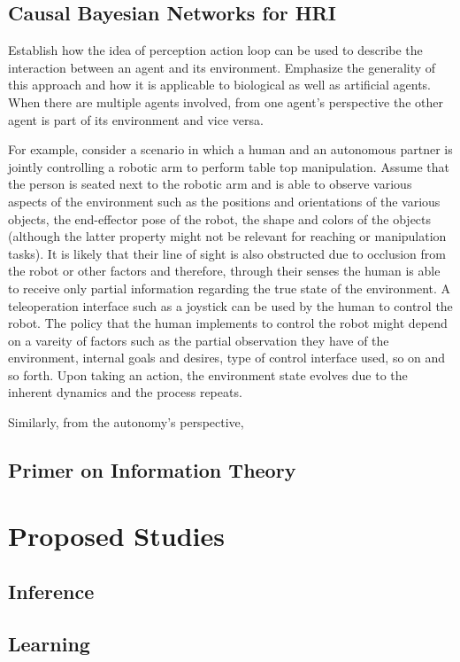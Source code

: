 \documentclass[12pt]{article}
\begin{document}
\subsection{Causal Bayesian Networks for HRI}

Establish how the idea of perception action loop can be used to describe the interaction between an agent and its environment. Emphasize the generality of this approach and how it is applicable to biological as well as artificial agents. When there are multiple agents involved, from one agent's perspective the other agent is part of its environment and vice versa. 

For example, consider a scenario in which a human and an autonomous partner is jointly controlling a robotic arm to perform table top manipulation. Assume that the person is seated next to the robotic arm and is able to observe various aspects of the environment such as the positions and orientations of the various objects, the end-effector pose of the robot, the shape and colors of the objects (although the latter property might not be relevant for reaching or manipulation tasks). It is likely that their line of sight is also obstructed due to occlusion from the robot or other factors and therefore, through their senses the human is able to receive only partial information regarding the true state of the environment. A teleoperation interface such as a joystick can be used by the human to control the robot. The policy that the human implements to control the robot might depend on a vareity of factors such as the partial observation they have of the environment, internal goals and desires, type of control interface used, so on and so forth. Upon taking an action, the environment state evolves due to the inherent dynamics and the process repeats. 

Similarly, from the autonomy's perspective, 
\subsection{Primer on Information Theory}

\pagebreak
\section{Proposed Studies}
\subsection{Inference}

\subsection{Learning}
\end{document}
